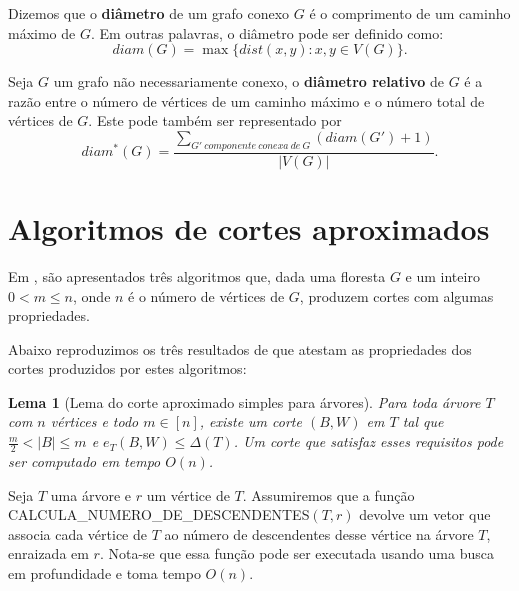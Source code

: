 \documentclass[a4paper,12pt]{article}
\newtheorem{lem}{Lema}
\begin{document}
	\bigskip
	\bigskip
	\bigskip
	\bigskip
	\bigskip
	\bigskip



	Dizemos que o \textbf{diâmetro} de um grafo conexo $G$ é o
	comprimento de um caminho máximo de $G$. 
	Em outras palavras, o diâmetro pode ser definido como:
	$$ diam(G)=\max\{dist(x,y):x,y\in V(G)\}. $$

	\bigskip

	Seja $G$ um grafo não necessariamente conexo,
	o \textbf{diâmetro relativo} de $G$
	 é a razão entre o número
	de vértices de um caminho máximo e o número total de vértices
	de $G$. Este pode também ser representado por
	$$ diam^*(G) = \frac{\displaystyle\sum_{
	G'~componente~conexa~de~G}^{}(diam(G')+1)}{|V(G)|}. $$
    
\newpage
\section {Algoritmos de cortes aproximados}

Em \cite{Schmidt15}, são apresentados três algoritmos que, dada uma 
floresta $G$ e um inteiro $0<m\le n$, onde $n$ é o número de vértices 
de $G$, produzem cortes com algumas propriedades.

Abaixo reproduzimos os três resultados de \cite{Schmidt15} que 
atestam as propriedades dos cortes produzidos por estes algoritmos:

\bigskip
\bigskip
\bigskip
\bigskip
\bigskip

\begin{lem}[Lema do corte aproximado simples para árvores]

	Para toda árvore $T$ com $n$ vértices e todo $m \in [n]$,
	existe um corte $(B,W)$ em $T$ tal que 
	$\frac{m}{2} <|B| \le m$ e
	$e_T(B,W) \le \Delta(T)$.
	Um corte que satisfaz esses requisitos pode ser computado em
	tempo $O(n)$.
\end{lem}

\medskip

Seja $T$ uma árvore e $r$ um vértice de $T$. 
Assumiremos que
a função CALCULA\_NUMERO\_DE\_DESCENDENTES$(T,r)$ devolve um vetor
que associa cada vértice de $T$ ao número de descendentes desse 
vértice na árvore $T$, enraizada em $r$. Nota-se que essa função pode
ser executada usando uma busca em profundidade e toma tempo $O(n)$.
\end{document}
